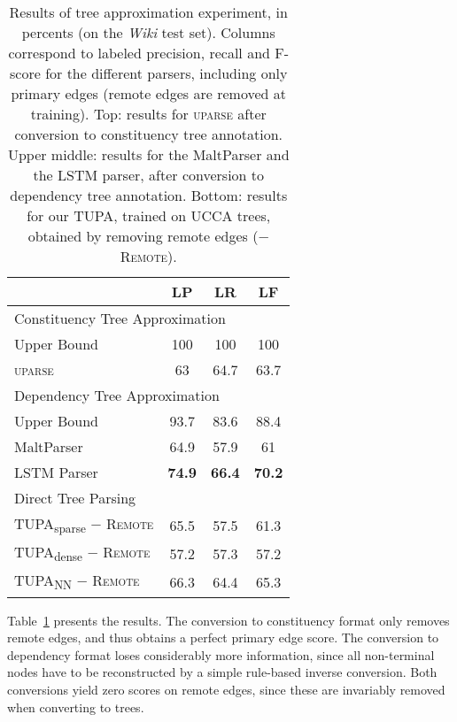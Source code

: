 \documentclass[11pt,a4paper]{article}
\newcommand{\parser}[1]{TUPA\textsubscript{#1}}
\newcommand{\tabref}[1]{Table~\ref{#1}}
\begin{document}
\begin{table}[ht]
\centering
\begin{tabular}{l|ccc}
& \textbf{LP} & \textbf{LR} & \textbf{LF} \\
\hline
\multicolumn{4}{l}{\rule{0pt}{2ex} \footnotesize Constituency Tree Approximation} \\
Upper Bound & 100 & 100 & 100 \vspace{.1cm} \\
\textsc{uparse} & 63 & 64.7 & 63.7 \\
\hline
\multicolumn{4}{l}{\rule{0pt}{2ex} \footnotesize Dependency Tree Approximation} \\
Upper Bound & 93.7 & 83.6 & 88.4 \vspace{.1cm} \\
MaltParser & 64.9 & 57.9 & 61 \\
LSTM Parser & {\bf 74.9} & {\bf 66.4} & {\bf 70.2} \\
\hline
\multicolumn{4}{l}{\rule{0pt}{2ex} \footnotesize Direct Tree Parsing} \\
\parser{sparse} $-$ \textsc{Remote} & 65.5 & 57.5 & 61.3 \\
\parser{dense} $-$ \textsc{Remote} & 57.2 & 57.3 & 57.2 \\
\parser{NN} $-$ \textsc{Remote} & 66.3 & 64.4 & 65.3 \\
\end{tabular}
\caption{\label{fig:tree_approx_results}
  Results of tree approximation experiment, in percents (on the \textit{Wiki} test set).
  Columns correspond to labeled precision,
  recall and F-score for the different parsers, including only primary edges
  (remote edges are removed at training).
  Top: results for \textsc{uparse}
  after conversion to constituency tree annotation. Upper middle: results for the
  MaltParser and the LSTM parser, after conversion to dependency tree annotation.
  Bottom: results for our \parser{}, trained on
  UCCA trees, obtained by removing remote edges ($-$\textsc{Remote}).
}
\end{table}

\tabref{fig:tree_approx_results} presents the results.
The conversion to constituency format only removes remote edges,
and thus obtains a perfect primary edge score.
The conversion to dependency format loses considerably more information, since
all non-terminal nodes have to be reconstructed by a simple rule-based inverse
conversion. Both conversions yield zero scores on remote edges,
since these are invariably removed when converting to trees.
\end{document}
